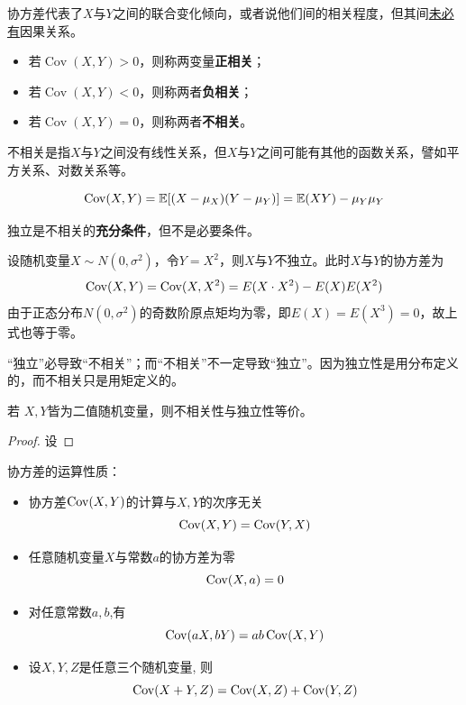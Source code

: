 协方差代表了$X$与$Y$之间的联合变化倾向，或者说他们间的相关程度，但其间\underline{未必有}因果关系。
\begin{itemize}
    \item 若$\operatorname{Cov}(X,Y) >0$，则称两变量\textbf{正相关}；
    \item 若$\operatorname{Cov}(X,Y) < 0$，则称两者\textbf{负相关}；
    \item 若$\operatorname{Cov}(X,Y) = 0$，则称两者\textbf{不相关}。
\end{itemize}

\begin{remark}
    不相关是指$X$与$Y$之间没有线性关系，但$X$与$Y$之间可能有其他的函数关系，譬如平方关系、对数关系等。
\end{remark}

\begin{proposition}
    \[ \operatorname{Cov}(X,Y)=\mathbb{E}[(X-\mu_X)(Y-\mu_Y)]=\mathbb{E}(XY)-\mu_Y \mu_Y \]
\end{proposition}

\begin{proposition}
    独立是不相关的\textbf{充分条件}，但不是必要条件。
\end{proposition}
\begin{example}\label{exam:3.4.6}
    设随机变量$X \sim N(0,\sigma^2)$，令$Y=X^2$，则$X$与$Y$不独立。此时$X$与$Y$的协方差为
    \[ \operatorname{Cov}(X, Y)=\operatorname{Cov}(X, X^2)=E(X\cdot X^2)-E(X)E(X^2) \]
    由于正态分布$N(0,\sigma^2)$的奇数阶原点矩均为零，即$E(X)=E(X^3)=0$，故上式也等于零。
\end{example}

“独立”必导致“不相关”；而“不相关”不一定导致“独立”。因为独立性是用分布定义的，而不相关只是用矩定义的。

\begin{proposition}
    若 $X, Y$皆为二值随机变量，则不相关性与独立性等价。
\end{proposition}
\begin{proof}
    设
\end{proof}

\begin{proposition}\label{prop:cov_property}
    协方差的运算性质：
    \begin{itemize}
        \item 协方差$\operatorname{Cov}(X,Y)$的计算与$X,Y$的次序无关
              \[ \operatorname{Cov}(X,Y)=\operatorname{Cov}(Y,X) \]
        \item 任意随机变量$X$与常数$a$的协方差为零
              \[ \operatorname{Cov}(X,a)=0 \]
        \item 对任意常数$a,b$,有
              \[ \operatorname{Cov}(a X, b Y)=a b \operatorname{Cov}(X, Y) \]
        \item 设$X,Y,Z$是任意三个随机变量, 则
              \[ \operatorname{Cov}(X+Y, Z)=\operatorname{Cov}(X, Z)+\operatorname{Cov}(Y, Z) \]
    \end{itemize}
\end{proposition}


